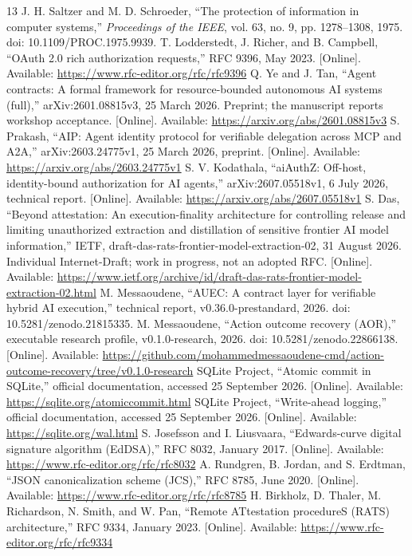 \begin{thebibliography}{13}
 J. H. Saltzer and M. D. Schroeder, ``The protection of information in computer systems,'' \emph{Proceedings of the IEEE}, vol. 63, no. 9, pp. 1278--1308, 1975. doi: 10.1109/PROC.1975.9939.
 T. Lodderstedt, J. Richer, and B. Campbell, ``OAuth 2.0 rich authorization requests,'' RFC 9396, May 2023. [Online]. Available: \url{https://www.rfc-editor.org/rfc/rfc9396}
 Q. Ye and J. Tan, ``Agent contracts: A formal framework for resource-bounded autonomous AI systems (full),'' arXiv:2601.08815v3, 25 March 2026. Preprint; the manuscript reports workshop acceptance. [Online]. Available: \url{https://arxiv.org/abs/2601.08815v3}
 S. Prakash, ``AIP: Agent identity protocol for verifiable delegation across MCP and A2A,'' arXiv:2603.24775v1, 25 March 2026, preprint. [Online]. Available: \url{https://arxiv.org/abs/2603.24775v1}
 S. V. Kodathala, ``aiAuthZ: Off-host, identity-bound authorization for AI agents,'' arXiv:2607.05518v1, 6 July 2026, technical report. [Online]. Available: \url{https://arxiv.org/abs/2607.05518v1}
 S. Das, ``Beyond attestation: An execution-finality architecture for controlling release and limiting unauthorized extraction and distillation of sensitive frontier AI model information,'' IETF, draft-das-rats-frontier-model-extraction-02, 31 August 2026. Individual Internet-Draft; work in progress, not an adopted RFC. [Online]. Available: \url{https://www.ietf.org/archive/id/draft-das-rats-frontier-model-extraction-02.html}
 M. Messaoudene, ``AUEC: A contract layer for verifiable hybrid AI execution,'' technical report, v0.36.0-prestandard, 2026. doi: 10.5281/zenodo.21815335.
 M. Messaoudene, ``Action outcome recovery (AOR),'' executable research profile, v0.1.0-research, 2026. doi: 10.5281/zenodo.22866138. [Online]. Available: \url{https://github.com/mohammedmessaoudene-cmd/action-outcome-recovery/tree/v0.1.0-research}
 SQLite Project, ``Atomic commit in SQLite,'' official documentation, accessed 25 September 2026. [Online]. Available: \url{https://sqlite.org/atomiccommit.html}
 SQLite Project, ``Write-ahead logging,'' official documentation, accessed 25 September 2026. [Online]. Available: \url{https://sqlite.org/wal.html}
 S. Josefsson and I. Liusvaara, ``Edwards-curve digital signature algorithm (EdDSA),'' RFC 8032, January 2017. [Online]. Available: \url{https://www.rfc-editor.org/rfc/rfc8032}
 A. Rundgren, B. Jordan, and S. Erdtman, ``JSON canonicalization scheme (JCS),'' RFC 8785, June 2020. [Online]. Available: \url{https://www.rfc-editor.org/rfc/rfc8785}
 H. Birkholz, D. Thaler, M. Richardson, N. Smith, and W. Pan, ``Remote ATtestation procedureS (RATS) architecture,'' RFC 9334, January 2023. [Online]. Available: \url{https://www.rfc-editor.org/rfc/rfc9334}
\end{thebibliography}
